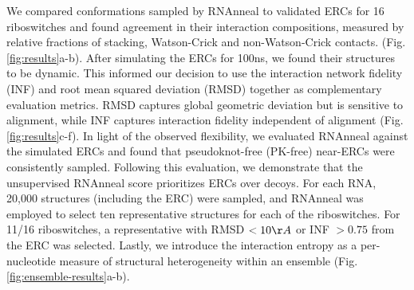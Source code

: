 \documentclass[%
aip,
 amsmath,amssymb,
reprint,%
twocolumn,
]{revtex4-1}
\begin{document}
We compared conformations sampled by RNAnneal to validated ERCs for 16 riboswitches and found agreement in their interaction compositions, measured by relative fractions of stacking, Watson-Crick and non-Watson-Crick contacts. (Fig. \ref{fig:results}a-b). After simulating the ERCs for 100ns, we found their structures to be dynamic. This informed our decision to use the interaction network fidelity (INF) and root mean squared deviation (RMSD) together as complementary evaluation metrics. RMSD captures global geometric deviation but is sensitive to alignment, while INF captures interaction fidelity independent of alignment (Fig. \ref{fig:results}c-f). In light of the observed flexibility, we evaluated RNAnneal against the simulated ERCs and found that pseudoknot-free (PK-free) near-ERCs were consistently sampled. Following this evaluation, we demonstrate that the unsupervised RNAnneal score prioritizes ERCs over decoys. For each RNA, 20,000 structures (including the ERC) were sampled, and RNAnneal was employed to select ten representative structures for each of the riboswitches. For 11/16 riboswitches, a representative with RMSD $<10\AA$ or INF $>0.75$ from the ERC was selected. Lastly, we introduce the interaction entropy as a per-nucleotide measure of structural heterogeneity within an ensemble (Fig. \ref{fig:ensemble-results}a-b).
\end{document}
